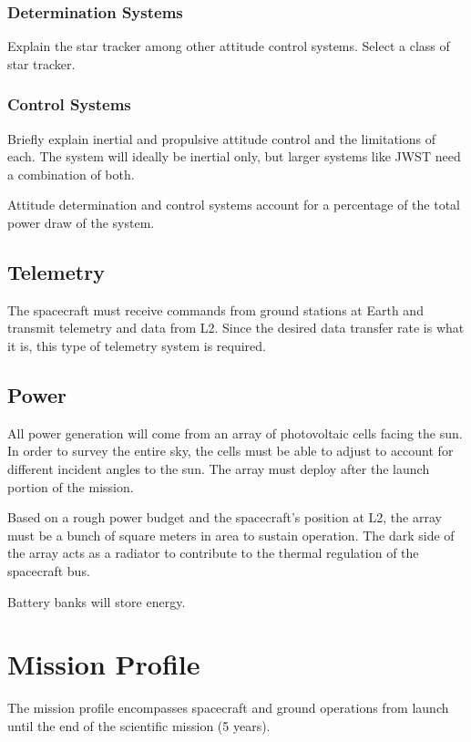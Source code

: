 \documentclass{ws-jai}
\begin{document}
\subsubsection{Determination Systems}
\label{ssS:determination}
Explain the star tracker among other attitude control systems. Select a class of star tracker.

\subsubsection{Control Systems}
\label{ssS:control}
Briefly explain inertial and propulsive attitude control and the limitations of each. The system will ideally be inertial only, but larger systems like JWST need a combination of both.

Attitude determination and control systems account for a percentage of the total power draw of the system.

\subsection{Telemetry}
\label{sS:telemetry}
The spacecraft must receive commands from ground stations at Earth and transmit telemetry and data from L2. Since the desired data transfer rate is what it is, this type of telemetry system is required.

\subsection{Power}
\label{sS:power}
All power generation will come from an array of photovoltaic cells facing the sun. In order to survey the entire sky, the cells must be able to adjust to account for different incident angles to the sun. The array must deploy after the launch portion of the mission.

Based on a rough power budget and the spacecraft's position at L2, the array must be a bunch of square meters in area to sustain operation. The dark side of the array acts as a radiator to contribute to the thermal regulation of the spacecraft bus.

Battery banks will store energy.

\section{Mission Profile}
\label{S:mission}
The mission profile encompasses spacecraft and ground operations from launch until the end of the scientific mission (5 years).
\end{document}

